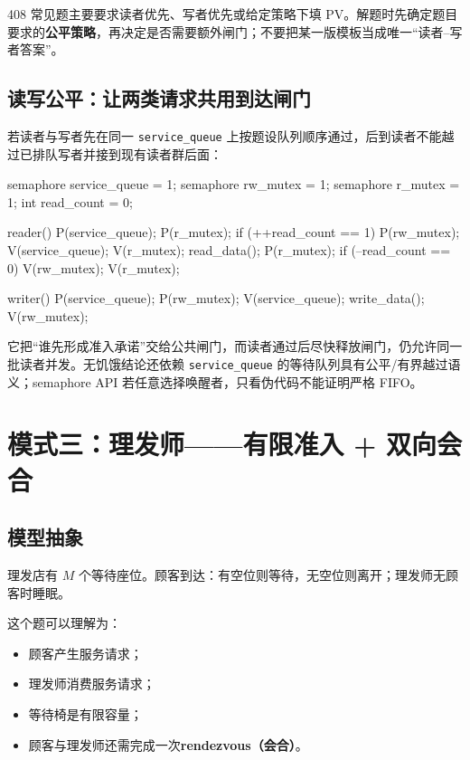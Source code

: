 \documentclass[11pt,a4paper]{ctexart}
\newcommand{\kw}[1]{\textbf{#1}}
\newcommand{\code}[1]{\texttt{#1}}
\begin{document}
\begin{exam}[考试层次]
408 常见题主要要求读者优先、写者优先或给定策略下填 PV。解题时先确定题目要求的\kw{公平策略}，再决定是否需要额外闸门；不要把某一版模板当成唯一“读者--写者答案”。
\end{exam}

\subsection{读写公平：让两类请求共用到达闸门}

若读者与写者先在同一 \code{service\_queue} 上按题设队列顺序通过，后到读者不能越过已排队写者并接到现有读者群后面：
\begin{codeblock}
semaphore service_queue = 1;
semaphore rw_mutex = 1;
semaphore r_mutex = 1;
int read_count = 0;

reader() {
    P(service_queue);
    P(r_mutex);
    if (++read_count == 1) P(rw_mutex);
    V(service_queue);
    V(r_mutex);
    read_data();
    P(r_mutex);
    if (--read_count == 0) V(rw_mutex);
    V(r_mutex);
}

writer() {
    P(service_queue);
    P(rw_mutex);
    V(service_queue);
    write_data();
    V(rw_mutex);
}
\end{codeblock}
它把“谁先形成准入承诺”交给公共闸门，而读者通过后尽快释放闸门，仍允许同一批读者并发。无饥饿结论还依赖 \code{service\_queue} 的等待队列具有公平/有界越过语义；semaphore API 若任意选择唤醒者，只看伪代码不能证明严格 FIFO。

\section{模式三：理发师——有限准入 + 双向会合}

\subsection{模型抽象}

理发店有 $M$ 个等待座位。顾客到达：有空位则等待，无空位则离开；理发师无顾客时睡眠。

这个题可以理解为：
\begin{itemize}
\item 顾客产生服务请求；
\item 理发师消费服务请求；
\item 等待椅是有限容量；
\item 顾客与理发师还需完成一次\kw{rendezvous（会合）}。
\end{itemize}
\end{document}
